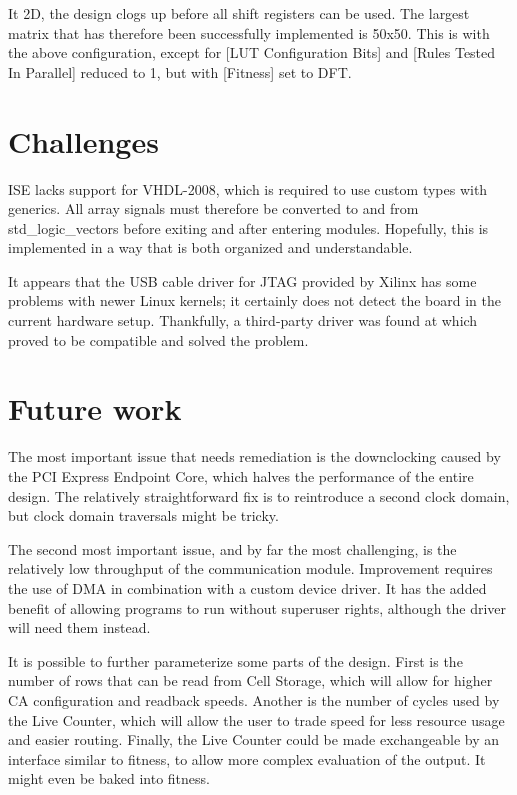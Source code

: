 It 2D, the design clogs up before all shift registers can be used.
The largest matrix that has therefore been successfully implemented is 50x50.
This is with the above configuration, except for [LUT Configuration Bits] and [Rules Tested In Parallel] reduced to 1, but with [Fitness] set to DFT.


\section{Challenges}
\label{sec:challenges}

ISE lacks support for VHDL-2008, which is required to use custom types with generics.
All array signals must therefore be converted to and from std\_logic\_vectors before exiting and after entering modules.
Hopefully, this is implemented in a way that is both organized and understandable.

It appears that the USB cable driver for JTAG provided by Xilinx has some problems with newer Linux kernels; it certainly does not detect the board in the current hardware setup.
Thankfully, a third-party driver was found at \cite{usbdriver} which proved to be compatible and solved the problem.



\section{Future work}

The most important issue that needs remediation is the downclocking caused by the PCI Express Endpoint Core, which halves the performance of the entire design.
The relatively straightforward fix is to reintroduce a second clock domain, but clock domain traversals might be tricky.

The second most important issue, and by far the most challenging, is the relatively low throughput of the communication module.
Improvement requires the use of DMA in combination with a custom device driver.
It has the added benefit of allowing programs to run without superuser rights, although the driver will need them instead.

It is possible to further parameterize some parts of the design.
First is the number of rows that can be read from Cell Storage, which will allow for higher CA configuration and readback speeds.
Another is the number of cycles used by the Live Counter, which will allow the user to trade speed for less resource usage and easier routing.
Finally, the Live Counter could be made exchangeable by an interface similar to fitness, to allow more complex evaluation of the output.
It might even be baked into fitness.

